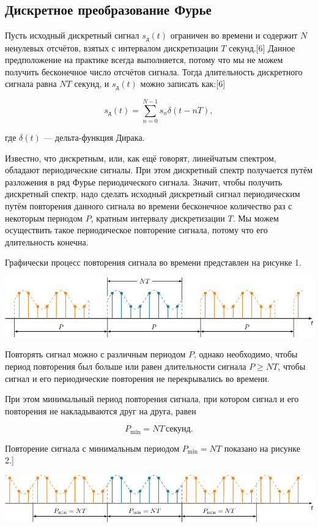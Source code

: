 \subsection{Дискретное преобразование Фурье}{
    Пусть исходный дискретный сигнал \( s_{\text{д}}(t) \) ограничен во времени и содержит \( N \) ненулевых отсчётов, взятых с интервалом дискретизации \( T \) секунд.[6] Данное предположение на практике всегда выполняется, потому что мы не можем получить бесконечное число отсчётов сигнала. Тогда длительность дискретного сигнала равна \( NT \) секунд, и \( s_{\text{д}}(t) \) можно записать как:[6]

\begin{equation}
s_{\text{д}}(t) = \sum_{n=0}^{N-1} s_n \delta(t - nT), \tag{2.1}
\end{equation}

где \( \delta(t) \) — дельта-функция Дирака.

Известно, что дискретным, или, как ещё говорят, линейчатым спектром, обладают периодические сигналы. При этом дискретный спектр получается путём разложения в ряд Фурье периодического сигнала. Значит, чтобы получить дискретный спектр, надо сделать исходный дискретный сигнал периодическим путём повторения данного сигнала во времени бесконечное количество раз с некоторым периодом \( P \), кратным интервалу дискретизации \( T \). Мы можем осуществить такое периодическое повторение сигнала, потому что его длительность конечна.

Графически процесс повторения сигнала во времени представлен на рисунке 1.
\begin{center}
    \includegraphics[width=1.0\textwidth]{dft_fig2.png}  
    \end{center}
    Повторять сигнал можно с различным периодом \( P \), однако необходимо, чтобы период повторения был больше или равен длительности сигнала \( P \geq NT \), чтобы сигнал и его периодические повторения не перекрывались во времени.

    При этом минимальный период повторения сигнала, при котором сигнал и его повторения не накладываются друг на друга, равен 
    
    \[
    P_{\text{min}} = NT \, \text{секунд}.
    \]
    
    Повторение сигнала с минимальным периодом \( P_{\text{min}} = NT \) показано на рисунке 2.]\

\begin{center}
    \includegraphics[width=1.0\textwidth]{dft_fig3.png}  
    \end{center}
}
